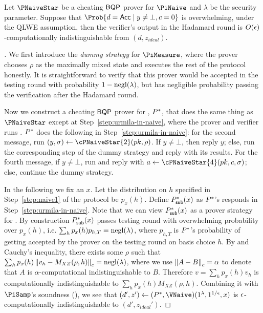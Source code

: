 \begin{theorem}
	\label{lem:naive-qpip0-binding}
	Let $\PNaiveStar$ be a cheating $\operatorname{\mathsf{BQP}}$ prover for $\PiNaive$ and $\lambda$ be the security parameter.
	Suppose that $\Prob{d=\Acc\mid y\ne\bot, c=0}$ is overwhelming, 
	under the QLWE assumption, then the verifier's output in the Hadamard round is $O(\epsilon)$-computationally indistinguishable from $(d, z_{ideal})$.
\end{theorem}
\begin{proof}[]
	We first introduce the \emph{dummy strategy} for $\PiMeasure$, where the prover chooses $\rho$ as the maximally mixed state and executes the rest of the protocol honestly.
	It is straightforward to verify that this prover would be accepted in the testing round with probability $1-\operatorname{negl}(\lambda)$,
	but has negligible probability passing the verification  after the Hadamard round.

  
	Now we construct a cheating $\operatorname{\mathsf{BQP}}$ prover for , $P^*$, that does the same thing as $\PNaiveStar$ except at Step~\ref{step:urmila-in-naive}, where the prover and verifier runs . $P^*$ does the following in Step~\ref{step:urmila-in-naive}:
	for the second message, run $(y, \sigma)\leftarrow\cPNaiveStar{2}(pk, \rho)$.
	If $y\ne\bot$, then reply $y$;
	else, run the corresponding step of the dummy strategy and reply with its results.
	For the fourth message, if $y\ne\bot$, run and reply with $a\leftarrow\cPNaiveStar{4}(pk, c, \sigma)$;
	else, continue the dummy strategy.




	 In the following we fix an $x$. Let the distribution on $h$ specified in Step~\ref{step:naive1} of the protocol be $p_x(h)$. Define $P^*_{\mathsf{sub}}(x)$ as $P^*$'s responds in Step~\ref{step:urmila-in-naive}. Note that we can view $P^*_{\mathsf{sub}}(x)$ as a prover strategy for . By construction $P^*_{\mathsf{sub}}(x)$ passes testing round with overwhelming probability over $p_x(h)$, i.e. $\sum_h p_x(h) p_{h,T} =\operatorname{negl}(\lambda)$, where $p_{h,T}$ is $P^*$'s probability of getting accepted by the prover on the testing round on basis choice $h$. By  and Cauchy's inequality, there exists some $\rho$ such that  $\sum_h p_x(h) \left\lVert v_h -M_{XZ}(\rho, h)\right\rVert_c = \operatorname{negl}(\lambda)$, where we use $\left\lVert A-B\right\rVert_c=\alpha$ to denote that $A$ is $\alpha$-computational indistinguishable to $B$. Therefore $v= \sum_h p_x(h) v_h$ is computationally indistinguishable to $\sum_h p_x(h) M_{XZ}(\rho, h)$. Combining it with $\PiSamp$'s soundness (), 
	we see that $(d', z')\leftarrow(\Pstar, \VNaive)(1^\lambda, 1^{1/\epsilon}, x)$  is $\epsilon$-computationally indistinguishable to $(d', z_{ideal}')$.


\end{proof}
